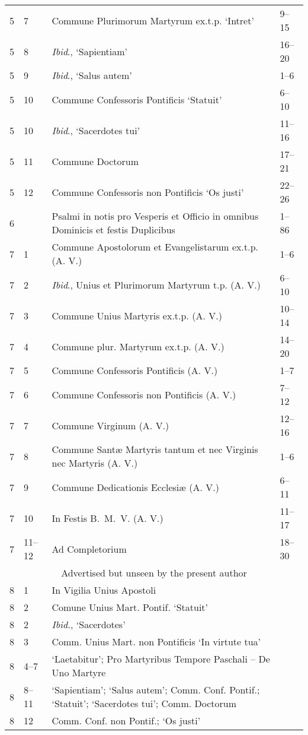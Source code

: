 \begin{landscape}
\begin{longtable}[c]{@{}llll@{}}
5 & 7 & Commune Plurimorum Martyrum ex.t.p. `Intret' & 9--15 \\
5 & 8 & \emph{Ibid}., `Sapientiam' & 16--20 \\
5 & 9 & \emph{Ibid}., `Salus autem' & 1--6 \\
5 & 10 & Commune Confessoris Pontificis `Statuit' & 6--10 \\
5 & 10 & \emph{Ibid}., `Sacerdotes tui' & 11--16 \\
5 & 11 & Commune Doctorum & 17--21 \\
5 & 12 & Commune Confessoris non Pontificis `Os justi' & 22--26 \\
6 & & Psalmi in notis pro Vesperis et Officio in omnibus Dominicis et festis Duplicibus & 1--86 \\
7 & 1 & Commune Apostolorum et Evangelistarum ex.t.p. (A. V.) & 1--6 \\
7 & 2 & \emph{Ibid}., Unius et Plurimorum Martyrum t.p. (A. V.) & 6--10 \\
7 & 3 & Commune Unius Martyris ex.t.p. (A. V.) & 10--14 \\
7 & 4 & Commune plur. Martyrum ex.t.p. (A. V.) & 14--20 \\
7 & 5 & Commune Confessoris Pontificis (A. V.) & 1--7 \\
7 & 6 & Commune Confessoris non Pontificis (A. V.) & 7--12 \\
7 & 7 & Commune Virginum (A. V.) & 12--16 \\
7 & 8 & Commune Santæ Martyris tantum et nec Virginis nec Martyris (A. V.) & 1--6 \\
7 & 9 & Commune Dedicationis Ecclesiæ (A. V.) & 6--11 \\
7 & 10 & In Festis B.~M.~V. (A. V.) & 11--17 \\
7 & 11--12 & Ad Completorium & 18--30 \\
\multicolumn{4}{c}{Advertised but unseen by the present author} \\
8 & 1 & In Vigilia Unius Apostoli &  \\
8 & 2 & Comune Unius Mart. Pontif. `Statuit' &  \\
8 & 2 & \emph{Ibid.}, `Sacerdotes' &  \\
8 & 3 & Comm. Unius Mart. non Pontificis `In virtute tua' &  \\
8 & 4--7 & `Laetabitur'; Pro Martyribus Tempore Paschali -- De Uno Martyre &  \\
8 & 8--11 & `Sapientiam'; `Salus autem'; Comm. Conf. Pontif.; `Statuit'; `Sacerdotes tui'; Comm. Doctorum &  \\
8 & 12 & Comm. Conf. non Pontif.; `Os justi' &  \\* \bottomrule
\end{longtable}
\end{landscape}
